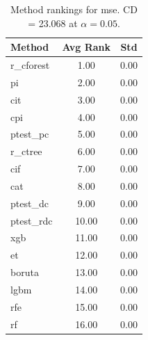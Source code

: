 \begin{table}[h]
\centering
\caption{Method rankings for mse. CD = 23.068 at $\alpha=0.05$.}
\label{tab:ranks_mse}
\begin{tabular}{lcc}
\toprule
Method & Avg Rank & Std \\
\midrule
r_cforest & 1.00 & 0.00 \\
pi & 2.00 & 0.00 \\
cit & 3.00 & 0.00 \\
cpi & 4.00 & 0.00 \\
ptest_pc & 5.00 & 0.00 \\
r_ctree & 6.00 & 0.00 \\
cif & 7.00 & 0.00 \\
cat & 8.00 & 0.00 \\
ptest_dc & 9.00 & 0.00 \\
ptest_rdc & 10.00 & 0.00 \\
xgb & 11.00 & 0.00 \\
et & 12.00 & 0.00 \\
boruta & 13.00 & 0.00 \\
lgbm & 14.00 & 0.00 \\
rfe & 15.00 & 0.00 \\
rf & 16.00 & 0.00 \\
\bottomrule
\end{tabular}
\end{table}